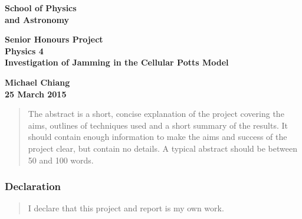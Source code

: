 \documentclass[a4paper,12pt]{article}
\begin{document}
\pagestyle{empty}                       %
\epsfxsize=40mm                         %
\begin{minipage}[b]{110mm}
        {\Huge\bf School of Physics\\ and Astronomy
        \vspace*{17mm}}
\end{minipage}
\hfill
\begin{minipage}[t]{40mm}               
\end{minipage}
\par\noindent                                           %
\vspace*{2cm}
\begin{center}
        \Large\bf \Large\bf Senior Honours Project\\
        \Large\bf Physics 4\\[10pt]                     %
        \LARGE\bf Investigation of Jamming in the Cellular Potts Model       %
\end{center}
\vspace*{0.5cm}
\begin{center}
        \bf Michael Chiang\\                           %
        25 March 2015                                    %
\end{center}
\vspace*{5mm}
%
%                       
\begin{abstract}
        The abstract is a short, concise explanation of the project
        covering the aims, outlines of techniques used and a short
        summary of the results. It should contain enough information to
        make the aims and success of the project clear, but contain no details.
        A typical abstract should be between 50 and 100 words.
\end{abstract}

\vspace*{1cm}

\subsubsection*{Declaration}

\begin{quotation}
        I declare that this project and report is my own work.
\end{quotation}
\end{document}

